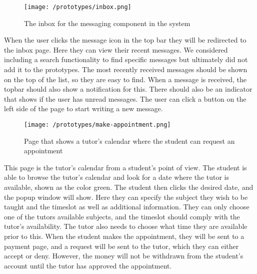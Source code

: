  \begin{figure}[H]
    \texttt{[image: /prototypes/inbox.png]}
     \caption{The inbox for the messaging component in the system}
     \label{fig:inbox}
 \end{figure}
When the user clicks the message icon in the top bar they will be redirected to the inbox page. Here they can view their recent messages. 
We considered including a search functionality to find specific messages but ultimately did not add it to the prototypes. 
The most recently received messages should be shown on the top of the list, so they are easy to find. 
When a message is received, the topbar should also show a notification for this. 
There should also be an indicator that shows if the user has unread messages. 
The user can click a button on the left side of the page to start writing a new message. 


 \begin{figure}[H]
    \texttt{[image: /prototypes/make-appointment.png]}
     \caption{Page that shows a tutor's calendar where the student can request an appointment}
     \label{fig:make-appointment}
 \end{figure}
 This page is the tutor's calendar from a student's point of view. 
 The student is able to browse the tutor's calendar and look for a date where the tutor is available, shown as the color green. 
 The student then clicks the desired date, and the popup window will show. 
 Here they can specify the subject they wish to be taught and the timeslot as well as additional information. 
 They can only choose one of the tutors available subjects, and the timeslot should comply with the tutor's availability. 
 The tutor also needs to choose what time they are available prior to this.
 When the student makes the appointment, they will be sent to a payment page, and a request will be sent to the tutor, which they can either accept or deny.
 However, the money will not be withdrawn from the student's account until the tutor has approved the appointment.

